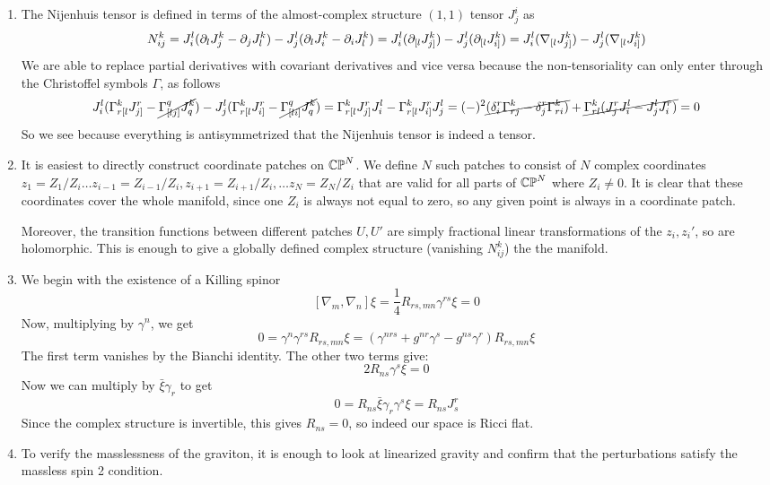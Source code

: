 \documentclass[11pt, class=article, crop=false]{standalone}
\begin{document}
\begin{enumerate}
	\item The Nijenhuis tensor is defined in terms of the almost-complex structure $(1,1)$ tensor $J^i_j$ as
	\[
		N_{ij}^k = J^l_i (\partial_{l} J^k_{j} - \partial_j J^k_l) - J_{j}^l (\partial_l J^k_i - \partial_i J^k_l)
		 = J^l_i (\partial_{[l} J^k_{j]}) - J_{j}^l (\partial_{[l} J^k_{i]}) = J^l_i (\nabla_{[l} J^k_{j]}) - J_{j}^l (\nabla_{[l} J^k_{i]})
	\]
	We are able to replace partial derivatives with covariant derivatives and vice versa because the non-tensoriality can only enter through the Christoffel symbols $\Gamma$, as follows
	\[
		J^l_i (\Gamma_{r[l}^k J_{j]}^r - \cancel{\Gamma_{[lj]}^q J_q^k} ) - J^l_j (\Gamma_{r[l}^k J_{i]}^r - \cancel{\Gamma_{[li]}^q J_q^k} ) =  \Gamma_{r[l}^k J_{j]}^r J^l_i - \Gamma_{r[l}^k J_{i]}^r  J^l_j = (-)^2 \cancel{(\delta^r_i \Gamma^k_{rj}  - \delta^r_j \Gamma^k_{ri})} + \cancel{\Gamma_{rl}^k (J^r_j J^l_i - J^l_j J^r_i)} =0
	\]
	So we see because everything is antisymmetrized that the Nijenhuis tensor is indeed a tensor. 
	
	
	\item It is easiest to directly construct coordinate patches on $\mathbb{CP}^N$. We define $N$ such patches to consist of $N$ complex coordinates $z_1 = Z_1/Z_i \dots z_{i-1} = Z_{i-1}/Z_{i}, z_{i+1} = Z_{i+1}/Z_i, \dots z_N = Z_N/Z_i$ that are valid for all parts of $\mathbb{CP}^N$ where $Z_i \neq 0$. It is clear that these coordinates cover the whole manifold, since one $Z_i$ is always not equal to zero, so any given point is always in a coordinate patch. 
	
	Moreover, the transition functions between different patches $U, U'$ are simply fractional linear transformations of the $z_i, z_i'$, so are holomorphic. This is enough to give a globally defined complex structure (vanishing $N_{ij}^k$) the the manifold. 
	
	\item We begin with the existence of a Killing spinor 
	\[
		[\nabla_m, \nabla_n]\xi = \frac14 R_{rs, mn} \gamma^{rs} \xi  =0
	\]
	Now, multiplying by $\gamma^n$, we get
	\[
		0 = \gamma^{n} \gamma^{rs} R_{rs, mn} \xi = (\gamma^{nrs} + g^{nr} \gamma^s - g^{ns} \gamma^r) R_{rs, mn} \xi 
	\]
	The first term vanishes by the Bianchi identity. The other two terms give:
	\[
		2 R_{ns} \gamma^s \xi = 0
	\]
	Now we can multiply by $\bar \xi \gamma_r$ to get
	\[
		0 = R_{ns} \bar \xi \gamma_r \gamma^s \xi = R_{ns} J^r_s
	\]
	Since the complex structure is invertible, this gives $R_{ns} = 0$, so indeed our space is Ricci flat.
	
	\item To verify the masslessness of the graviton, it is enough to look at linearized gravity and confirm that the perturbations satisfy the massless spin 2 condition. 
	

\end{enumerate}
\end{document}
